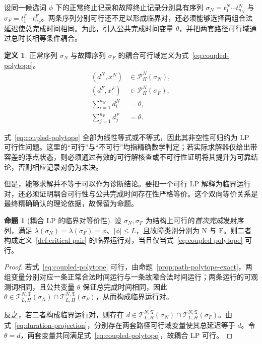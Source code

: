 \documentclass[master,fontset=ubuntu]{shnuthesis}
\theoremstyle{definition}
\newtheorem{thesisdefinition}{定义}
\newtheorem{thesisproposition}{命题}
\begin{document}
设同一候选词 \(\phi\) 下的正常终止记录和故障终止记录分别具有序列 \(\sigma_N=t_1^N\cdots t_{n_N}^N\) 与 \(\sigma_F=t_1^F\cdots t_{n_F}^F\)。两条序列分别可行还不足以形成临界对，还必须能够选择两组合法延迟使总完成时间相同。为此，引入公共完成时间变量 \(\theta\)，并把两套路径可行域通过总时长相等条件耦合。

\begin{thesisdefinition}
\label{def:coupled-polytope}
正常序列 \(\sigma_N\) 与故障序列 \(\sigma_F\) 的耦合可行域定义为式~\eqref{eq:coupled-polytope}。
\begin{equation}
\begin{aligned}
(d^N,x^N)&\in\mathcal P_H^N(\sigma_N),\\
(d^F,x^F)&\in\mathcal P_H^N(\sigma_F),\\
\sum_{i=1}^{n_N}d_i^N&=\theta,\\
\sum_{j=1}^{n_F}d_j^F&=\theta.
\end{aligned}
\label{eq:coupled-polytope}
\end{equation}
\end{thesisdefinition}

式~\eqref{eq:coupled-polytope} 全部为线性等式或不等式，因此其非空性可归约为 LP 可行性问题。这里的“可行”与“不可行”均指精确数学判定；若实际求解器仅给出带容差的浮点状态，则必须通过有效的可行解核查或不可行性证明将其提升为可靠结论，否则相应记录对仍为未决。

但是，能够求解并不等于可以作为诊断结论。要把一个可行 LP 解释为临界运行对，还必须证明耦合可行性与公共完成时间存在性严格等价。这个双向等价关系是最终精确确认的理论依据，故保留为命题。

\begin{thesisproposition}[耦合 LP 的临界对等价性]
\label{prop:coupled-lp}
设 \(\sigma_N,\sigma_F\) 为结构上可行的\emph{首次完成}发射序列，满足 \(\lambda(\sigma_N)=\lambda(\sigma_F)=\phi\)、\(|\phi|\leq L\)，且故障类别分别为 \(\mathrm N\) 与 \(\mathrm F\)。则二者构成定义~\ref{def:critical-pair} 的临界运行对，当且仅当式~\eqref{eq:coupled-polytope} 可行。
\end{thesisproposition}

\begin{proof}
若式~\eqref{eq:coupled-polytope} 可行，由命题~\ref{prop:path-polytope-exact}，两组变量分别对应一条正常合法时间运行与一条故障合法时间运行；两条运行的可观测词相同，且公共变量 \(\theta\) 保证总完成时间相同，因此 \(\theta\in\mathcal T_{L,H}^{N,\mathfrak T}(\sigma_N)\cap\mathcal T_{L,H}^{N,\mathfrak T}(\sigma_F)\)，从而构成临界运行对。

反之，若二者构成临界运行对，则存在 \(d\in\mathcal T_{L,H}^{N,\mathfrak T}(\sigma_N)\cap\mathcal T_{L,H}^{N,\mathfrak T}(\sigma_F)\)。由式~\eqref{eq:duration-projection}，分别存在两套路径可行域变量使其总延迟等于 \(d\)。令 \(\theta=d\)，两套变量共同满足式~\eqref{eq:coupled-polytope}，故耦合 LP 可行。
\end{proof}
\end{document}
